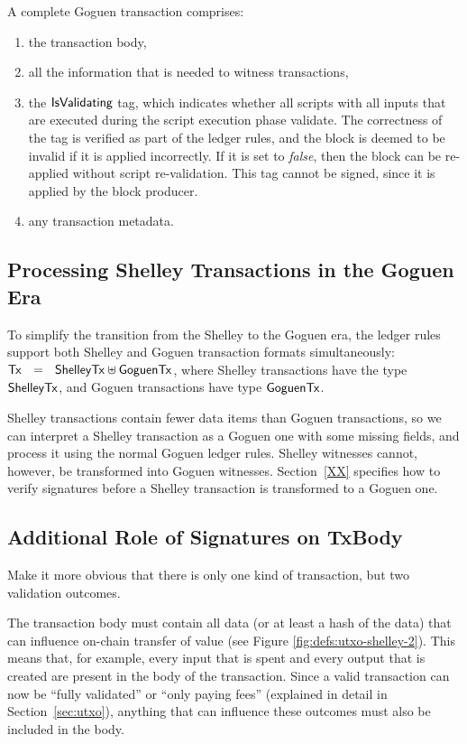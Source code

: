 A complete Goguen transaction comprises:

\begin{enumerate}
  \item the transaction body,
  \item all the information that is needed to witness transactions,
  \item the $\mathsf{IsValidating}$ tag, which indicates whether all scripts with all inputs
  that are executed during the script execution phase validate.
  The correctness of the tag is verified as part of the ledger rules, and the block is
  deemed to be invalid if it is applied incorrectly.
  If it is set to \emph{false}, then the block can be re-applied without script re-validation.
  This tag cannot be signed, since it is applied by the block producer.
  \item any transaction metadata.
\end{enumerate}


\subsection{Processing Shelley Transactions in the Goguen Era}

To simplify the transition from the Shelley to the Goguen era, the
ledger rules support both Shelley and Goguen transaction formats
simultaneously: $\mathsf{Tx} ~~=~~ \mathsf{ShelleyTx} \uplus \mathsf{GoguenTx}$, where
Shelley transactions have the type $\mathsf{ShelleyTx}$, and Goguen
transactions have type $\mathsf{GoguenTx}$.

Shelley transactions contain fewer data items than Goguen transactions, so we can interpret
a Shelley transaction as a Goguen one with some missing fields, and process it using the normal Goguen ledger
rules.  Shelley witnesses cannot, however, be transformed into Goguen witnesses.
Section~\ref{XX} specifies how to verify signatures before a
Shelley transaction is transformed to a Goguen one.

\subsection{Additional Role of Signatures on TxBody}
\begin{note}
  Make it more obvious that there is only one kind of transaction, but two validation outcomes.
\end{note}
The transaction body must contain all data
(or at least a hash of the data) that can influence
on-chain transfer of value
(see Figure \ref{fig:defs:utxo-shelley-2}).
This means that, for example,
every input that is spent and every output that is created are present in the body of the transaction.
Since a valid transaction can now be ``fully validated'' or ``only paying
fees'' (explained in detail in Section~\ref{sec:utxo}), anything that
can influence these outcomes must also be included in the body.

